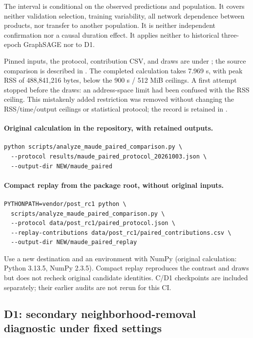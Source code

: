 The interval is conditional on the observed predictions and population. It covers neither validation selection, training variability, all network dependence between products, nor transfer to another population. It is neither independent confirmation nor a causal duration effect. It applies neither to historical three-epoch GraphSAGE nor to D1.

Pinned inputs, the protocol, contribution CSV, and draws are under ; the source comparison is described in . The completed calculation takes 7.969 s, with peak RSS of 488,841,216 bytes, below the 900 s / 512 MiB ceilings. A first attempt stopped before the draws: an address-space limit had been confused with the RSS ceiling. This mistakenly added restriction was removed without changing the RSS/time/output ceilings or statistical protocol; the record is retained in .

\paragraph{Original calculation in the repository, with retained outputs.}
\begin{Verbatim}[fontsize=\footnotesize]
python scripts/analyze_maude_paired_comparison.py \
  --protocol results/maude_paired_protocol_20261003.json \
  --output-dir NEW/maude_paired
\end{Verbatim}

\paragraph{Compact replay from the package root, without original inputs.}
\begin{Verbatim}[fontsize=\footnotesize]
PYTHONPATH=vendor/post_rc1 python \
  scripts/analyze_maude_paired_comparison.py \
  --protocol data/post_rc1/paired_protocol.json \
  --replay-contributions data/post_rc1/paired_contributions.csv \
  --output-dir NEW/maude_paired_replay
\end{Verbatim}
Use a new destination and an environment with NumPy (original calculation: Python 3.13.5, NumPy 2.3.5). Compact replay reproduces the contrast and draws but does not recheck original candidate identities. C/D1 checkpoints are included separately; their earlier audits are not rerun for this CI.


\subsection{D1: secondary neighborhood-removal diagnostic under fixed settings}

